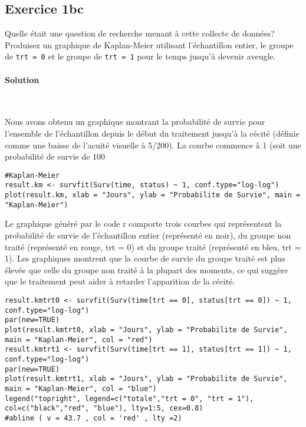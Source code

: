 \documentclass[../main.tex]{subfiles}
\begin{document}
\begin{CJK*}{UTF8}{gbsn}

\section*{Exercice 1bc}
Quelle était une question de recherche menant à cette collecte de données?
Produisez un graphique de Kaplan-Meier utilisant l'échantillon entier,
le groupe de \texttt{trt = 0} et le groupe de \texttt{trt = 1} 
pour le temps jusqu'à devenir aveugle.

\paragraph{Solution}\

Nous avons obtenu un graphique montrant la probabilité de survie pour l'ensemble de l'échantillon depuis le début du traitement jusqu'à la cécité (définie comme une baisse de l'acuité visuelle à 5/200). La courbe commence à 1 (soit une probabilité de survie de 100 %

\begin{lstlisting}
#Kaplan-Meier 
result.km <- survfit(Surv(time, status) ~ 1, conf.type="log-log")
plot(result.km, xlab = "Jours", ylab = "Probabilite de Survie", main = "Kaplan-Meier")

\end{lstlisting}


Le graphique généré par le code r comporte trois courbes qui représentent la probabilité de survie de l'échantillon entier (représenté en noir), du groupe non traité (représenté en rouge, trt = 0) et du groupe traité (représenté en bleu, trt = 1). Les graphiques montrent que la courbe de survie du groupe traité est plus élevée que celle du groupe non traité à la plupart des moments, ce qui suggère que le traitement peut aider à retarder l'apparition de la cécité.

\begin{lstlisting}
result.kmtrt0 <- survfit(Surv(time[trt == 0], status[trt == 0]) ~ 1, conf.type="log-log")
par(new=TRUE)
plot(result.kmtrt0, xlab = "Jours", ylab = "Probabilite de Survie", main = "Kaplan-Meier", col = "red")
result.kmtrt1 <- survfit(Surv(time[trt == 1], status[trt == 1]) ~ 1, conf.type="log-log")
par(new=TRUE)
plot(result.kmtrt1, xlab = "Jours", ylab = "Probabilite de Survie", main = "Kaplan-Meier", col = "blue")
legend("topright", legend=c("totale","trt = 0", "trt = 1"), col=c("black","red", "blue"), lty=1:5, cex=0.8)
#abline ( v = 43.7 , col = 'red' , lty =2)
\end{lstlisting}

\end{CJK*}
\end{document}
